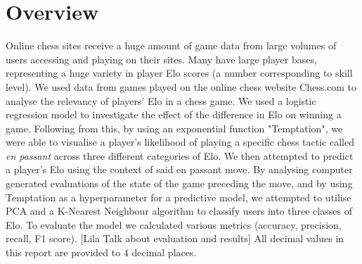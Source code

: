\documentclass[10pt,a4paper]{article}
\begin{document}
\section{Overview}
Online chess sites receive a huge amount of game data from large volumes of users accessing and playing on their sites. Many have large player bases, representing a huge variety in player Elo scores (a number corresponding to skill level). We used data from games played on the online chess website Chess.com to analyse the relevancy of players' Elo in a chess game. We used a logistic regression model to investigate the effect of the difference in Elo on winning a game. Following from this, by using an exponential function "Temptation", we were able to visualise a player's likelihood of playing a specific chess tactic called \textit{en passant} across three different categories of Elo. We then attempted to predict a player's Elo using the context of said en passant move. By analysing computer generated evaluations of the state of the game preceding the move, and by using Temptation as a hyperparameter for a predictive model, we attempted to utilise PCA and a K-Nearest Neighbour algorithm to classify users into three classes of Elo. To evaluate the model we calculated various metrics (accuracy, precision, recall, F1 score). [Lila Talk about evaluation and results]\newline
All decimal values in this report are provided to 4 decimal places.
\end{document}
